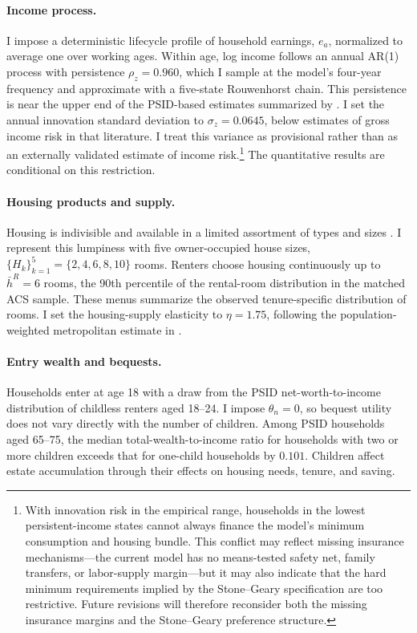 \documentclass[11pt]{article}
\theoremstyle{definition}
\newcommand{\1}{\mathbf 1}
\begin{document}
\paragraph{Income process.}
I impose a deterministic lifecycle profile of household earnings, $e_a$,
normalized to average one over working ages. Within age, log income follows an
annual AR(1) process with persistence $\rho_z=0.960$, which I sample at the
model's four-year frequency and approximate with a five-state Rouwenhorst
chain. This persistence is near the upper end of the PSID-based estimates
summarized by \citet{sommerImplicationsUSTax2018}. I set the annual innovation
standard deviation to $\sigma_z=0.0645$, below estimates of gross income risk
in that literature. I treat this variance as provisional rather than as an
externally validated estimate of income risk.\footnote{With innovation risk in
the empirical range, households in the lowest persistent-income states cannot
always finance the model's minimum consumption and housing bundle. This
conflict may reflect missing insurance mechanisms---the current model has no
means-tested safety net, family transfers, or labor-supply margin---but it may
also indicate that the hard minimum requirements implied by the Stone--Geary
specification are too restrictive. Future revisions will therefore reconsider
both the missing insurance margins and the Stone--Geary preference structure.}
The quantitative results are conditional on this restriction.

\paragraph{Housing products and supply.}
Housing is indivisible and available in a limited assortment of types and
sizes \citep{davisHousingFinanceMacroeconomy2015}. I represent this lumpiness
with five owner-occupied house sizes,
$\{H_k\}_{k=1}^5=\{2,4,6,8,10\}$ rooms. Renters choose housing continuously up
to $\bar h^R=6$ rooms, the 90th percentile of the rental-room distribution in
the matched ACS sample. These menus summarize the observed tenure-specific
distribution of rooms. I set the
housing-supply elasticity to $\eta=1.75$, following the population-weighted
metropolitan estimate in \citet{saizGeographicDeterminantsHousing2010}.

\paragraph{Entry wealth and bequests.}
Households enter at age 18 with a draw from the PSID net-worth-to-income
distribution of childless renters aged 18--24. I impose $\theta_n=0$, so
bequest utility does not vary directly with the number of children. Among PSID
households aged 65--75, the median total-wealth-to-income ratio for households
with two or more children exceeds that for one-child households by $0.101$.
Children affect estate accumulation through their effects on housing needs,
tenure, and saving.
\end{document}
